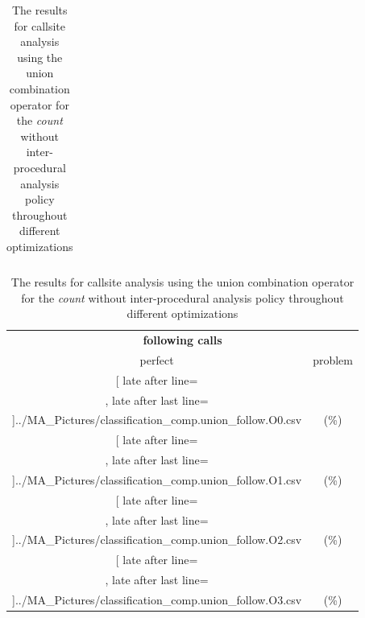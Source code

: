\begin{table}[!htbp]
{\begin{tabular}{l|c|c|c}
    	\end{tabular}

	\begin{tabular}{|c|c}%

	\toprule
	\multicolumn{2}{c}{\bfseries  following calls}\\
	
	perfect &  problem %
	\\\midrule
	\csvreader[ late after line=\\, late after last line=\\\midrule]{../MA_Pictures/classification_comp.union_follow.O0.csv}{
}
	{\csvcoliv (\csvcolv \%) & \csvcolvi (\csvcolvii\%)}%



\multicolumn{1}{c}{} 
	\\\midrule
	\csvreader[ late after line=\\, late after last line=\\\midrule]{../MA_Pictures/classification_comp.union_follow.O1.csv}{
}
	{\csvcoliv (\csvcolv \%) & \csvcolvi (\csvcolvii\%)}%
	
	
\multicolumn{1}{c}{}
	\\\midrule
	\csvreader[ late after line=\\, late after last line=\\\midrule]{../MA_Pictures/classification_comp.union_follow.O2.csv}{
}
	{\csvcoliv (\csvcolv \%) & \csvcolvi (\csvcolvii\%)}%
	

\multicolumn{1}{c}{}
	\\\midrule
	\csvreader[ late after line=\\, late after last line=\\\bottomrule]{../MA_Pictures/classification_comp.union_follow.O3.csv}{
}
	{\csvcoliv (\csvcolv \%) & \csvcolvi (\csvcolvii\%)}%


    	\end{tabular}
}
		\caption {The results for callsite analysis using the union combination operator for the \textit{count} without inter-procedural analysis policy throughout different optimizations}
		\label{tbl:CSunionCOUNTnointer}
\end{table}




